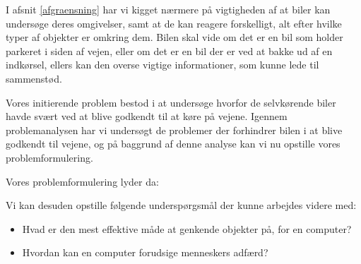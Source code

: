 I afsnit \ref{afgraensning} har vi kigget nærmere på vigtigheden af at biler kan undersøge deres omgivelser, samt at de kan reagere forskelligt, alt efter hvilke typer af objekter er omkring dem. Bilen skal vide om det er en bil som holder parkeret i siden af vejen, eller om det er en bil der er ved at bakke ud af en indkørsel, ellers kan den overse vigtige informationer, som kunne lede til sammenstød. 

Vores initierende problem bestod i at undersøge hvorfor de selvkørende biler havde svært ved at blive godkendt til at køre på vejene. Igennem problemanalysen har vi undersøgt de problemer der forhindrer bilen i at blive godkendt til vejene, og på baggrund af denne analyse kan vi nu opstille vores problemformulering.

Vores problemformulering lyder da:

\vspace{10 mm}
\noindent{}

\vspace{10 mm}

Vi kan desuden opstille følgende underspørgsmål der kunne arbejdes videre med:
\begin{itemize}
	\item Hvad er den mest effektive måde at genkende objekter på, for en computer?
	\item Hvordan kan en computer forudsige menneskers adfærd?
\end{itemize}